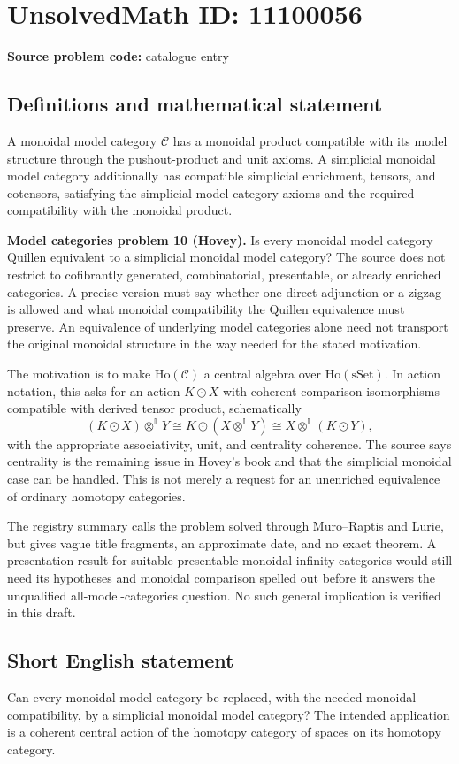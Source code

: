 \documentclass[11pt]{article}
\begin{document}
\section*{UnsolvedMath ID: 11100056}
\textbf{Source problem code:} catalogue entry
\subsection{Definitions and mathematical statement}
A monoidal model category $\mathcal C$ has a monoidal product compatible with its model structure through the pushout-product and unit axioms. A simplicial monoidal model category additionally has compatible simplicial enrichment, tensors, and cotensors, satisfying the simplicial model-category axioms and the required compatibility with the monoidal product.

\textbf{Model categories problem 10 (Hovey).} Is every monoidal model category Quillen equivalent to a simplicial monoidal model category? The source does not restrict to cofibrantly generated, combinatorial, presentable, or already enriched categories. A precise version must say whether one direct adjunction or a zigzag is allowed and what monoidal compatibility the Quillen equivalence must preserve. An equivalence of underlying model categories alone need not transport the original monoidal structure in the way needed for the stated motivation.

The motivation is to make $\mathrm{Ho}(\mathcal C)$ a central algebra over $\mathrm{Ho}(\mathrm{sSet})$. In action notation, this asks for an action $K\odot X$ with coherent comparison isomorphisms compatible with derived tensor product, schematically
\[
 (K\odot X)\otimes^{\mathbb L}Y
 \cong K\odot(X\otimes^{\mathbb L}Y)
 \cong X\otimes^{\mathbb L}(K\odot Y),
\]
with the appropriate associativity, unit, and centrality coherence. The source says centrality is the remaining issue in Hovey's book and that the simplicial monoidal case can be handled. This is not merely a request for an unenriched equivalence of ordinary homotopy categories.

The registry summary calls the problem solved through Muro--Raptis and Lurie, but gives vague title fragments, an approximate date, and no exact theorem. A presentation result for suitable presentable monoidal infinity-categories would still need its hypotheses and monoidal comparison spelled out before it answers the unqualified all-model-categories question. No such general implication is verified in this draft.
\subsection{Short English statement}
Can every monoidal model category be replaced, with the needed monoidal compatibility, by a simplicial monoidal model category? The intended application is a coherent central action of the homotopy category of spaces on its homotopy category.
\end{document}
